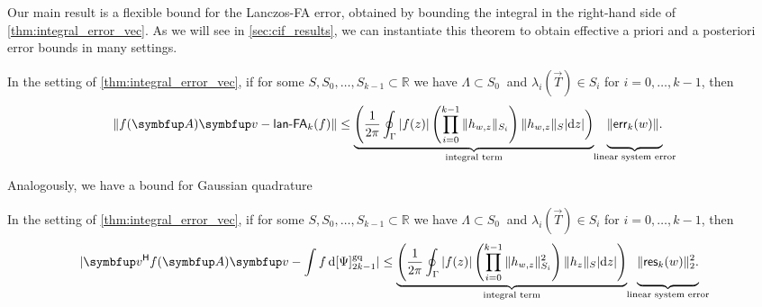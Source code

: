 Our main result is a flexible bound for the  Lanczos-FA error, obtained by bounding the integral in the right-hand side of \cref{thm:integral_error_vec}. As we will see in \cref{sec:cif_results}, we can instantiate this theorem to obtain effective a priori and a posteriori error bounds in many settings.
\begin{theorem}
\label{thm:err_int}
In the setting of \cref{thm:integral_error_vec}, if for some $S,S_0,\ldots,S_{k-1} \subset \mathbb{R}$ we have \( \Lambda\subset S_0\ \) and \( \lambda_i(\vec{T}) \in S_i \) for  \( i=0,\ldots, k-1 \), then
\begin{equation*}
    \| \fA\vec{v} - \lan_k(f) \|
    \leq \underbrace{\vphantom{ \Bigg| }\Bigg( \frac{1}{2\pi}\oint_{\Gamma} |f(z)| \left(\prod_{i=0}^{k-1} \| h_{w,z}\|_{S_i}\right) \|h_{w,z}\|_{S} | \d{z} | \bigg)}_{\text{integral term}} \hspace{-.2em}\underbrace{\vphantom{ \Bigg| } \| \err_k(w) \|.}_{\text{linear system error}}
\end{equation*}
\end{theorem}
Analogously, we have a bound for Gaussian quadrature
\begin{theorem}
\label{thm:err_int_GQ}
In the setting of \cref{thm:integral_error_vec}, if for some $S,S_0,\ldots,S_{k-1} \subset \mathbb{R}$ we have \( \Lambda\subset S_0\ \) and \( \lambda_i(\vec{T}) \in S_i \) for  \( i=0,\ldots, k-1 \), then
\begin{equation*}
    | \vec{v}^\cT\fA\vec{v} - \int f \,\d\qq[g]{\Psi}{2k-1} |
    \leq  \underbrace{\vphantom{\Bigg|}\Bigg( \frac{1}{2\pi} \oint_{\Gamma} | f(z) |  \left( \prod_{i=0}^{k-1} \|h_{w,z}\|_{S_i}^2  \right) \| h_z \|_{S} |\d{z}| \Bigg)}_{\text{integral term}} \hspace{-.2em}\underbrace{\vphantom{\Bigg|} \| \Res_k(w) \|_2^2.}_{\text{linear system error}}  \label{eqn:err_quad_int}
\end{equation*}
\end{theorem}


